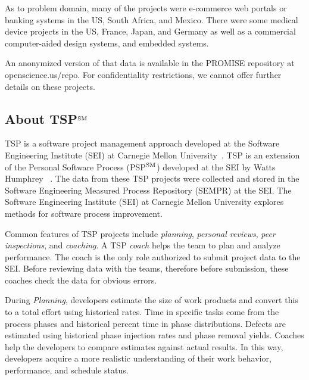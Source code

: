 \documentclass[smallcondesed]{svjour3}
\begin{document}
As to problem domain,
many of the projects were e-commerce web portals or banking systems in the US, South Africa, and Mexico. 
There were  some  medical device projects in  the US, France, Japan, and Germany as well  as a commercial computer-aided design systems, and embedded systems. 

An anonymized version of that data is available in the PROMISE repository at openscience.us/repo.
For confidentiality restrictions, we cannot offer 
further details on these projects.

\subsection{About TSP$\textsuperscript{SM}$}\label{sect:tsp}

TSP is a software project management approach developed at the Software Engineering Institute (SEI) at Carnegie Mellon University~\cite{tsp00}. TSP is an extension of the Personal Software Process (PSP$\textsuperscript{SM}$) developed at the SEI by Watts Humphrey ~\cite{tsp00}. The data from these TSP projects were collected and stored in the Software Engineering Measured Process Repository (SEMPR) at the SEI. The Software Engineering Institute (SEI) at Carnegie Mellon University explores methods for software process improvement.
 


Common features of TSP projects include {\em planning}, {\em personal reviews}, {\em peer inspections}, and {\em coaching}.
A TSP {\em coach} helps the team to plan and analyze performance. The coach is the only role authorized to submit project data to the SEI.
Before reviewing data with the teams, therefore before submission, these coaches check the data for obvious errors.

During {\em Planning}, developers estimate the size of work products and convert this to a total effort using historical rates. Time in specific tasks come from the  process phases and historical percent time in phase distributions. Defects are estimated using historical phase injection rates and phase removal yields. Coaches help the developers to compare estimates against actual results. In this way, developers acquire a more realistic understanding of their work behavior, performance, and schedule status.
\end{document}
